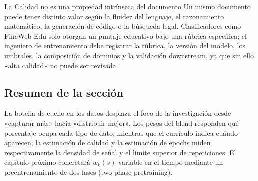 \begin{warningbox}{La Calidad no es una propiedad intrínseca del documento}
Un mismo documento puede tener distinto valor según la fluidez del lenguaje, el razonamiento matemático, la generación de código o la búsqueda legal. Clasificadores como FineWeb-Edu solo otorgan un puntaje educativo bajo una rúbrica específica; el ingeniero de entrenamiento debe registrar la rúbrica, la versión del modelo, los umbrales, la composición de dominios y la validación downstream, ya que sin ello «alta calidad» no puede ser revisada.
\end{warningbox}

\subsection{Resumen de la sección}

La botella de cuello en los datos desplaza el foco de la investigación desde «capturar más» hacia «distribuir mejor». Los pesos del blend responden qué porcentaje ocupa cada tipo de dato, mientras que el currículo indica cuándo aparecen; la estimación de calidad y la estimación de epochs miden respectivamente la densidad de señal y el límite superior de repeticiones. El capítulo próximo concretará $w_k(s)$ variable en el tiempo mediante un preentrenamiento de dos fases (two-phase pretraining).


